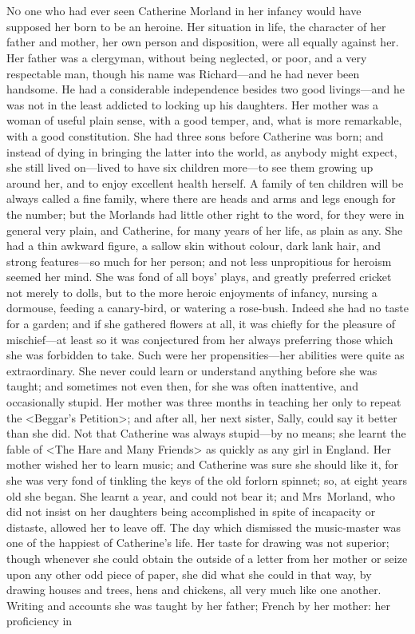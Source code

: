 \chapter[Chapter \thechapter]{}
 \lettrine{N}{o} one who had ever seen Catherine Morland in her infancy would have supposed her born to be an heroine. Her situation in life, the character of her father and mother, her own person and disposition, were all equally against her. Her father was a clergyman, without being neglected, or poor, and a very respectable man, though his name was Richard—and he had never been handsome. He had a considerable independence besides two good livings—and he was not in the least addicted to locking up his daughters. Her mother was a woman of useful plain sense, with a good temper, and, what is more remarkable, with a good constitution. She had three sons before Catherine was born; and instead of dying in bringing the latter into the world, as anybody might expect, she still lived on—lived to have six children more—to see them growing up around her, and to enjoy excellent health herself. A family of ten children will be always called a fine family, where there are heads and arms and legs enough for the number; but the Morlands had little other right to the word, for they were in general very plain, and Catherine, for many years of her life, as plain as any. She had a thin awkward figure, a sallow skin without colour, dark lank hair, and strong features—so much for her person; and not less unpropitious for heroism seemed her mind. She was fond of all boys' plays, and greatly preferred cricket not merely to dolls, but to the more heroic enjoyments of infancy, nursing a dormouse, feeding a canary-bird, or watering a rose-bush. Indeed she had no taste for a garden; and if she gathered flowers at all, it was chiefly for the pleasure of mischief—at least so it was conjectured from her always preferring those which she was forbidden to take. Such were her propensities—her abilities were quite as extraordinary. She never could learn or understand anything before she was taught; and sometimes not even then, for she was often inattentive, and occasionally stupid. Her mother was three months in teaching her only to repeat the <Beggar's Petition>; and after all, her next sister, Sally, could say it better than she did. Not that Catherine was always stupid—by no means; she learnt the fable of <The Hare and Many Friends> as quickly as any girl in England. Her mother wished her to learn music; and Catherine was sure she should like it, for she was very fond of tinkling the keys of the old forlorn spinnet; so, at eight years old she began. She learnt a year, and could not bear it; and Mrs~Morland, who did not insist on her daughters being accomplished in spite of incapacity or distaste, allowed her to leave off. The day which dismissed the music-master was one of the happiest of Catherine's life. Her taste for drawing was not superior; though whenever she could obtain the outside of a letter from her mother or seize upon any other odd piece of paper, she did what she could in that way, by drawing houses and trees, hens and chickens, all very much like one another. Writing and accounts she was taught by her father; French by her mother: her proficiency in 